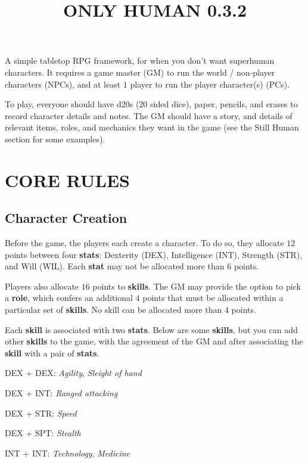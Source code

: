 \documentclass[11pt]{article}
\title{\vspace{-4ex}ONLY HUMAN 0.3.2\vspace{-6.5ex}}
\date{}
\begin{document}
\begin{multicols}{3}
  \maketitle

  A simple tabletop RPG framework, for when you don't want superhuman characters. It requires a game master (GM) to run the world / non-player characters (NPCs), and at least $1$ player to run the player character(s) (PCs).

  To play, everyone should have d20s ($20$ sided dice), paper, pencils, and erases to record character details and notes. The GM should have a story, and details of relevant items, roles, and mechanics they want in the game (see the Still Human section for some examples).
  \section*{CORE RULES}

  \subsection*{Character Creation}

  Before the game, the players each create a character. To do so, they allocate $12$ points between four \textbf{stats}: Dexterity (DEX), Intelligence (INT), Strength (STR), and Will (WIL). Each \textbf{stat} may not be allocated more than $6$ points.

  Players also allocate $16$ points to \textbf{skills}. The GM may provide the option to pick a \textbf{role}, which confers an additional $4$ points that must be allocated within a particular set of \textbf{skills}. No skill can be allocated more than $4$ points.

  Each \textbf{skill} is associated with two \textbf{stats}. Below are some \textbf{skills}, but you can add other \textbf{skills} to the game, with the agreement of the GM and after associating the \textbf{skill} with a pair of \textbf{stats}.

  \begin{multicols}{2}
    DEX + DEX: ​\textit{Agility​},​ \textit{Sleight of hand}

    DEX + INT: \textit{​Ranged attacking​}

    DEX + STR: ​\textit{Speed}

    DEX + SPT: ​\textit{Stealth}

    INT + INT: ​\textit{Technology​},​ \textit{Medicine}


\end{multicols}
\end{multicols}
\end{document}
